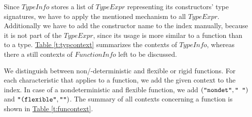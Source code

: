 \documentclass[%
	pdftex,%
	a4paper,%
	oneside,%
	chapterprefix,%
	headsepline,%
	12pt%
]{scrbook}
\newcommand{\Conid}[1]{\mathit{#1}}
\begin{document}
Since \ensuremath{\Conid{TypeInfo}} stores a list of \ensuremath{\Conid{TypeExpr}} representing its
constructors' type signatures, we have to apply the mentioned
mechanism to all \ensuremath{\Conid{TypeExpr}}. %
Additionally we have to add the constructor name to the index
manually, because it is not part of the \ensuremath{\Conid{TypeExpr}}, since its usage is
more similar to a function than to a type. %
\hyperref[t:typcontext]{Table \ref{t:typcontext}} summarizes the
contexts of \ensuremath{\Conid{TypeInfo}}, whereas there a still contexts of
\ensuremath{\Conid{FunctionInfo}} left to be discussed. %

\begin{table}[h]
\caption{The contexts for a \ensuremath{\Conid{TypeInfo}} data structure}
\label{t:typcontext}
\end{table}

We distinguish between non/-deterministic and flexible or rigid
functions. %
For each characteristic that applies to a function, we add the given
context to the index. %
In case of a nondeterministic and flexible function, we
add \ensuremath{(\text{\tt \char34 nondet\char34},\text{\tt \char34 ~\char34})} and \ensuremath{\text{\tt \char34 (flexible\char34},\text{\tt \char34 \char34})}. %
The summary of all contexts concerning a function is shown in
\hyperref[t:funcontext]{Table \ref{t:funcontext}}.

\begin{table}[h]
\caption{The contexts for a \ensuremath{\Conid{FunctionInfo}} data structure}
\label{t:funcontext}
\end{table}
\end{document}
